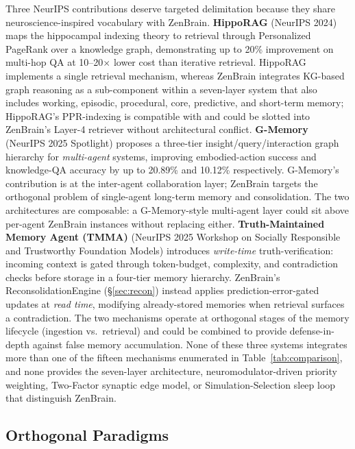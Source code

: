 \documentclass{article}
\begin{document}
Three NeurIPS contributions deserve targeted delimitation because they
share neuroscience-inspired vocabulary with ZenBrain.
\textbf{HippoRAG} \citep{gutierrez2024hipporag} (NeurIPS 2024) maps the
hippocampal indexing theory to retrieval through Personalized PageRank
over a knowledge graph, demonstrating up to 20\% improvement on
multi-hop QA at 10--20$\times$ lower cost than iterative retrieval.
HippoRAG implements a single retrieval mechanism, whereas ZenBrain
integrates KG-based graph reasoning as a sub-component within a
seven-layer system that also includes working, episodic, procedural,
core, predictive, and short-term memory; HippoRAG's PPR-indexing is
compatible with and could be slotted into ZenBrain's Layer-4 retriever
without architectural conflict.
\textbf{G-Memory} \citep{zhang2025gmemory} (NeurIPS 2025 Spotlight)
proposes a three-tier insight/query/interaction graph hierarchy for
\emph{multi-agent} systems, improving embodied-action success and
knowledge-QA accuracy by up to 20.89\% and 10.12\% respectively.
G-Memory's contribution is at the inter-agent collaboration layer;
ZenBrain targets the orthogonal problem of single-agent long-term
memory and consolidation. The two architectures are composable: a
G-Memory-style multi-agent layer could sit above per-agent ZenBrain
instances without replacing either.
\textbf{Truth-Maintained Memory Agent (TMMA)} \citep{koch2025tmma}
(NeurIPS 2025 Workshop on Socially Responsible and Trustworthy
Foundation Models) introduces \emph{write-time} truth-verification:
incoming context is gated through token-budget, complexity, and
contradiction checks before storage in a four-tier memory hierarchy.
ZenBrain's ReconsolidationEngine (\S\ref{sec:recon}) instead
applies prediction-error-gated updates at \emph{read time}, modifying
already-stored memories when retrieval surfaces a contradiction. The
two mechanisms operate at orthogonal stages of the memory lifecycle
(ingestion vs.\ retrieval) and could be combined to provide
defense-in-depth against false memory accumulation.
None of these three systems integrates more than one of the fifteen
mechanisms enumerated in Table~\ref{tab:comparison}, and none provides
the seven-layer architecture, neuromodulator-driven priority weighting,
Two-Factor synaptic edge model, or Simulation-Selection sleep loop that
distinguish ZenBrain.

\subsection{Orthogonal Paradigms}
\end{document}
